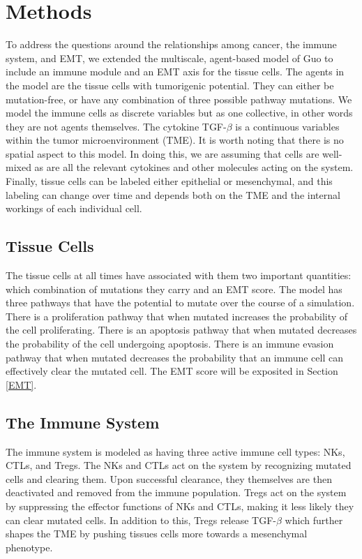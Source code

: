 \documentclass{article}
\begin{document}


\section{Methods}
To address the questions around the relationships among cancer, the immune system, and EMT, we extended the multiscale, agent-based model of Guo to include an immune module and an EMT axis for the tissue cells.
The agents in the model are the tissue cells with tumorigenic potential.
They can either be mutation-free, or have any combination of three possible pathway mutations.
We model the immune cells as discrete variables but as one collective, in other words they are not agents themselves.
The cytokine TGF-$\beta$ is a continuous variables within the tumor microenvironment (TME).
It is worth noting that there is no spatial aspect to this model.
In doing this, we are assuming that cells are well-mixed as are all the relevant cytokines and other molecules acting on the system.
Finally, tissue cells can be labeled either epithelial or mesenchymal, and this labeling can change over time and depends both on the TME and the internal workings of each individual cell.

\subsection{Tissue Cells}\label{TissueCells}
The tissue cells at all times have associated with them two important quantities: which combination of mutations they carry and an EMT score.
The model has three pathways that have the potential to mutate over the course of a simulation.
There is a proliferation pathway that when mutated increases the probability of the cell proliferating.
There is an apoptosis pathway that when mutated decreases the probability of the cell undergoing apoptosis.
There is an immune evasion pathway that when mutated decreases the probability that an immune cell can effectively clear the mutated cell.
The EMT score will be exposited in Section \ref{EMT}. %



\subsection{The Immune System}\label{ImmuneSystem}
The immune system is modeled as having three active immune cell types: NKs, CTLs, and Tregs.
The NKs and CTLs act on the system by recognizing mutated cells and clearing them.
Upon successful clearance, they themselves are then deactivated and removed from the immune population.
%
Tregs act on the system by suppressing the effector functions of NKs and CTLs, making it less likely they can clear mutated cells.
In addition to this, Tregs release TGF-$\beta$ which further shapes the TME by pushing tissues cells more towards a mesenchymal phenotype.
\end{document}
